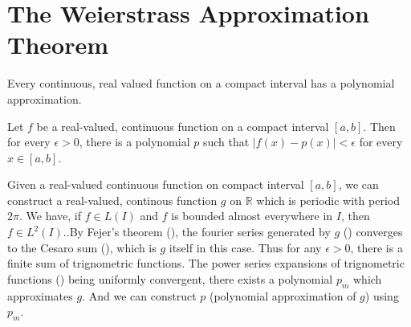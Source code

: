 \section{The Weierstrass Approximation Theorem}
	Every continuous, real valued function on a compact interval has a polynomial approximation.\cite[Theorem 11.17]{apostol}
	\begin{theorem}[Weierstrass]
		Let $f$ be a real-valued, continuous function on a compact interval $[a,b]$. Then for every $\epsilon > 0$, there is a polynomial $p$ such that $|f(x)-p(x)| < \epsilon$ for every $x \in [a,b]$.
	\end{theorem}
	\begin{synopsis}
		Given a real-valued continuous function on compact interval $[a,b]$, we can construct a real-valued, continous function $g$ on $\mathbb{R}$ which is periodic with period $2\pi$. We have, if $f \in L(I)$ and $f$ is bounded almost everywhere in $I$, then $f \in L^2(I)$.\cite[Theorem 10.52]{apostol}.By Fejer's theorem (\cite[Theorem 11.15]{apostol}), the fourier series generated by $g$ (\cite[definition 11.3]{apostol}) converges to the Cesaro sum (\cite[Definition 8.47]{apostol}), which is $g$ itself in this case. Thus for any $\epsilon > 0$, there is a finite sum of trignometric functions. The power series expansions of trignometric functions (\cite[definition 9.27]{apostol}) being uniformly convergent, there exists a polynomial $p_m$ which approximates $g$. And we can construct $p$ (polynomial approximation of $g$) using $p_m$.
	\end{synopsis}
